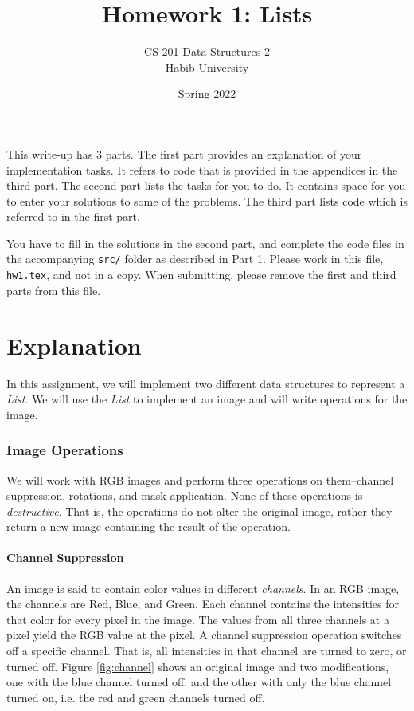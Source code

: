 \documentclass[addpoints]{exam}
\title{Homework 1: Lists}
\author{CS 201 Data Structures 2\\Habib University}
\date{Spring 2022}
\begin{document}
\maketitle

This write-up has 3 parts. The first part provides an explanation of your implementation tasks. It refers to code that is provided in the appendices in the third part. The second part lists the tasks for you to do. It contains space for you to enter your solutions to some of the problems. The third part lists code which is referred to in the first part.

You have to fill in the solutions in the second part, and complete the code files in the accompanying \texttt{src/} folder as described in Part 1. Please work in this file, \texttt{hw1.tex}, and not in a copy. When submitting, please remove the first and third parts from this file.

\part{Explanation}

  In this assignment, we will implement two different data structures to represent a \textit{List}. We will use the \textit{List} to implement an image and will write operations for the image.

  \section{Image Operations}
  \label{sec:imgops}

  We will work with RGB images and perform three operations on them--channel suppression, rotations, and mask application. None of these operations is \textit{destructive}. That is, the operations do not alter the original image, rather they return a new image containing the result of the operation.

  \subsection{Channel Suppression}

  An image is said to contain color values in different \textit{channels}. In an RGB image, the channels are Red, Blue, and Green. Each channel contains the intensities for that color for every pixel in the image. The values from all three channels at a pixel yield the RGB value at the pixel. A channel suppression operation switches off a specific channel. That is, all intensities in that channel are turned to zero, or turned off. Figure \ref{fig:channel} shows an original image and two modifications, one with the blue channel turned off, and the other with only the blue channel turned on, i.e. the red and green channels turned off.
\end{document}
